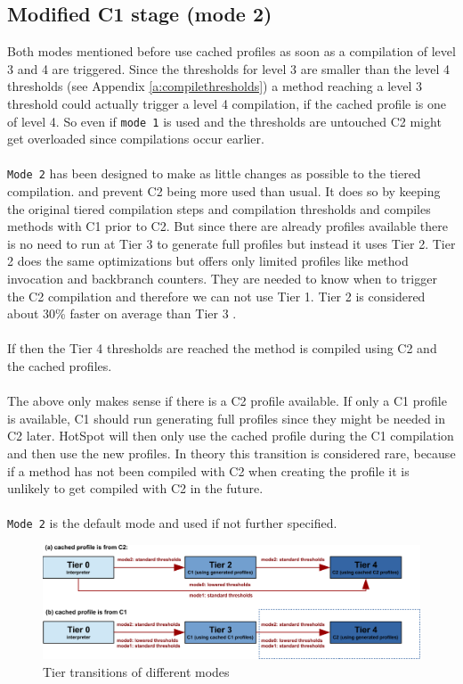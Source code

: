 \subsection{Modified C1 stage (mode 2)}
\label{s:mode2}
Both modes mentioned before use cached profiles as soon as a compilation of level 3 and 4 are triggered. Since the thresholds for level 3 are smaller than the level 4 thresholds (see Appendix \ref{a:compilethresholds}) a method reaching a level 3 threshold could actually trigger a level 4 compilation, if the cached profile is one of level 4. So even if \texttt{mode 1} is used and the thresholds are untouched C2 might get overloaded since compilations occur earlier.
\\\\
\texttt{Mode 2} has been designed to make as little changes as possible to the tiered compilation. and prevent C2 being more used than usual. It does so by keeping the original tiered compilation steps and compilation thresholds and compiles methods with C1 prior to C2. But since there are already profiles available there is no need to run at Tier 3 to generate full profiles but instead it uses Tier 2.
Tier 2 does the same optimizations but offers only limited profiles like method invocation and backbranch counters. They are needed to know when to trigger the C2 compilation and therefore we can not use Tier 1. Tier 2 is considered about 30\% faster on average than Tier 3 \cite{code_atp_hpp}.
\\\\
If then the Tier 4 thresholds are reached the method is compiled using C2 and the cached profiles.
\\\\
The above only makes sense if there is a C2 profile available.
If only a C1 profile is available, C1 should run generating full profiles since they might be needed in C2 later. HotSpot will then only use the cached profile during the C1 compilation and then use the new profiles.
In theory this transition is considered rare, because if a method has not been compiled with C2 when creating the profile it is unlikely to get compiled with C2 in the future.
\\\\
\texttt{Mode 2} is the default mode and used if not further specified.

\begin{figure}[h]
  \begin{center}
    \centering
    \includegraphics{figures/hs_tiers_threshold.png}
    \caption{Tier transitions of different modes}
    \label{f:hs_tiers_thresholds}
  \end{center}
\end{figure}


